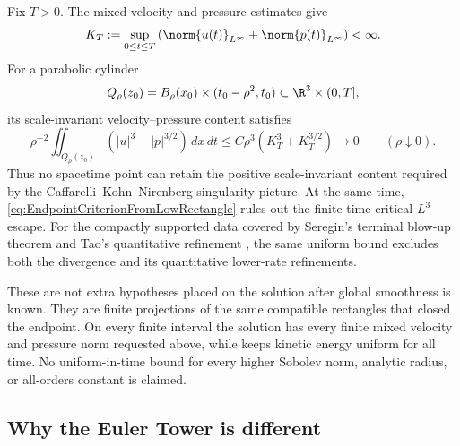 Fix \(T>0\).
The mixed velocity and pressure estimates give
\begin{equation}\label{eq:FiniteIntervalVelocityPressureSupremum}
  K_T
  :=\sup_{0\leq t\leq T}
  \left(
    \norm{u(t)}_{L^\infty}
    +\norm{p(t)}_{L^\infty}
  \right)
  <\infty.
\end{equation}
For a parabolic cylinder
\[
  Q_\rho(z_0)
  =B_\rho(x_0)\times(t_0-\rho^2,t_0)
  \subset\R^3\times(0,T],
\]
its scale-invariant velocity--pressure content satisfies
\begin{equation}\label{eq:VanishingLocalScaleInvariantContent}
  \rho^{-2}
  \iint_{Q_\rho(z_0)}
  \left(|u|^3+|p|^{3/2}\right)\,dx\,dt
  \leq
  C\rho^3\left(K_T^3+K_T^{3/2}\right)
  \longrightarrow0
  \qquad(\rho\downarrow0).
\end{equation}
Thus no spacetime point can retain the positive scale-invariant content required by the Caffarelli--Kohn--Nirenberg singularity picture.
At the same time, \eqref{eq:EndpointCriterionFromLowRectangle} rules out the finite-time critical \(L^3\) escape.
For the compactly supported data covered by Seregin's terminal blow-up theorem and Tao's quantitative refinement \parencite{Seregin2012,Tao2021Quantitative}, the same uniform bound excludes both the divergence and its quantitative lower-rate refinements.

These are not extra hypotheses placed on the solution after global smoothness is known.
They are finite projections of the same compatible rectangles that closed the endpoint.
On every finite interval the solution has every finite mixed velocity and pressure norm requested above, while  keeps kinetic energy uniform for all time.
No uniform-in-time bound for every higher Sobolev norm, analytic radius, or all-orders constant is claimed.

\subsection{Why the Euler Tower is different}\label{sub:WhyTheEulerTowerIsDifferent}

